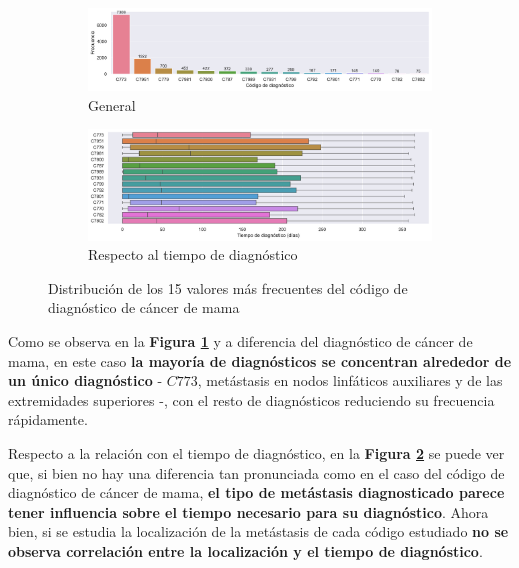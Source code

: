 \begin{itemize}[leftmargin=*]
	\begin{figure}[h]
		\begin{center}
			\begin{subfigure}{\linewidth}
				\begin{center}
					\includegraphics[width=0.9\linewidth]{figs/chapter3/categorical/mcdistribution}
					\caption{General}\label{fig:ch3mcdist}
				\end{center}
			\end{subfigure} 
			\begin{subfigure}{\linewidth}
				\begin{center}
					\includegraphics[width=0.9\linewidth]{figs/chapter3/categorical/mcperiod}
					\caption{Respecto al tiempo de diagnóstico}\label{fig:ch3mcperiod}
				\end{center}
			\end{subfigure} 
		\end{center}
		\captionsetup{aboveskip=-5pt, belowskip=-15pt, justification=centering}
		\caption{Distribución de los 15 valores más frecuentes del código de diagnóstico de cáncer de mama}
		\label{fig:ch3mc}
	\end{figure}
	
	Como se observa en la \textbf{Figura \ref{fig:ch3mcdist}} y a diferencia del diagnóstico de cáncer de mama, en este caso \textbf{la mayoría de diagnósticos se concentran alrededor de un único diagnóstico} - $C773$, metástasis en nodos linfáticos auxiliares y de las extremidades superiores -, con el resto de diagnósticos reduciendo su frecuencia rápidamente.
	
	Respecto a la relación con el tiempo de diagnóstico, en la \textbf{Figura \ref{fig:ch3mcperiod}} se puede ver que, si bien no hay una diferencia tan pronunciada como en el caso del código de diagnóstico de cáncer de mama, \textbf{el tipo de metástasis diagnosticado parece tener influencia sobre el tiempo necesario para su diagnóstico}. Ahora bien, si se estudia la localización de la metástasis de cada código estudiado \textbf{no se observa correlación entre la localización y el tiempo de diagnóstico}.
	

\end{itemize}
